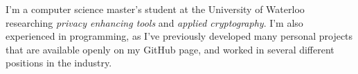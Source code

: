 \documentclass[9pt]{developercv} %
\begin{document}
\vspace{0.5cm}



\begin{minipage}[t]{0.4\textwidth} %
	\vspace{-\baselineskip} %
	I'm a computer science master's student at the University of Waterloo researching \textit{privacy enhancing tools} and \textit{applied cryptography}. I'm also experienced in programming, as I've previously developed many personal projects that are available openly on my GitHub page, and worked in several different positions in the industry.
\end{minipage}
\hfill %
\begin{minipage}[t]{0.5\textwidth} %
	\vspace{-\baselineskip} %
	\begin{barchart}{5.5}
	\end{barchart}
\end{minipage}



\end{document}
